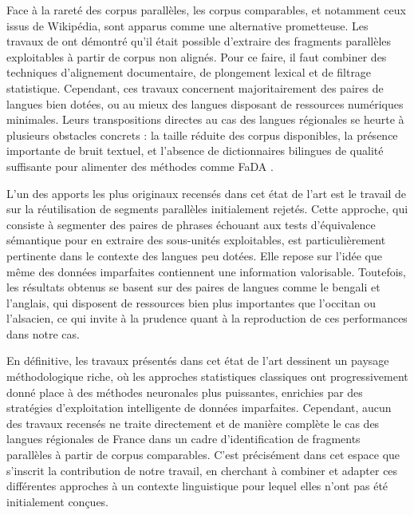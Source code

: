 Face à la rareté des corpus parallèles, les corpus comparables, et notamment ceux issus de Wikipédia, sont
apparus comme une alternative prometteuse. Les travaux de 
\citet{sharoff_2013a, sharoff_2016, steingrimsson_2021} ont démontré qu'il était possible d'extraire des fragments
parallèles exploitables à partir de corpus non alignés. Pour ce faire, il faut combiner des techniques d'alignement
documentaire, de plongement lexical et de filtrage statistique. Cependant, ces travaux concernent
majoritairement des paires de langues bien dotées, ou au mieux des langues disposant de ressources numériques
minimales. Leurs transpositions directes au cas des langues régionales se heurte à plusieurs obstacles concrets{ :}
la taille réduite des corpus disponibles, la présence importante de bruit textuel, et l'absence de
dictionnaires bilingues de qualité suffisante pour alimenter des méthodes comme FaDA \citep{lohar_2016}.

\newpage

L'un des apports les plus originaux recensés dans cet état de l'art est le travail de \citet{steingrimsson_2023}
sur la réutilisation de segments parallèles initialement rejetés. Cette approche, qui consiste à segmenter des
paires de phrases échouant aux tests d'équivalence sémantique pour en extraire des sous-unités exploitables,
est particulièrement pertinente dans le contexte des langues peu dotées. Elle repose sur l'idée que même des
données imparfaites contiennent une information valorisable. Toutefois, les résultats obtenus se basent sur des paires
de langues comme le bengali et l'anglais, qui disposent de ressources bien plus importantes que
l'occitan ou l'alsacien, ce qui invite à la prudence quant à la reproduction de ces performances dans notre cas.

En définitive, les travaux présentés dans cet état de l'art dessinent un paysage méthodologique riche, où les
approches statistiques classiques ont progressivement donné place à des méthodes neuronales plus puissantes,
enrichies par des stratégies d'exploitation intelligente de données imparfaites.
Cependant, aucun des travaux recensés ne traite directement et de manière complète le cas des langues
régionales de France dans un cadre d'identification de fragments parallèles à partir de corpus comparables.
C'est précisément dans cet espace que s'inscrit la contribution de notre travail, en cherchant à combiner et
adapter ces différentes approches à un contexte linguistique pour lequel elles n'ont pas été initialement
conçues.